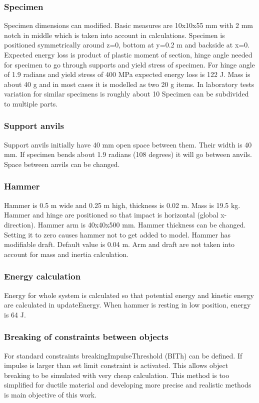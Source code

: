 \subsubsection{Specimen}
Specimen dimensions can modified. Basic measures are 10x10x55 mm with 2 mm notch in middle which is taken into account in calculations. Specimen is positioned symmetrically around z=0, bottom at y=0.2 m and backside at x=0. 
Expected energy loss is product of plastic moment of section, hinge angle needed for specimen to go through supports and 
yield stress of specimen. For hinge angle of 1.9 radians and yield stress of 400 MPa expected energy 
loss is 122 J. Mass is about 40 g and in most cases it is modelled as two 20 g items. In laboratory tests variation for similar 
specimens is roughly about 10 %
Specimen can be subdivided to multiple parts.

\subsubsection{Support anvils}
Support anvils initially have 40 mm open space between them. Their width is 40 mm. 
If specimen bends about 1.9 radians (108 degrees) it will go between anvils. Space between anvils can be changed.

\subsubsection{Hammer}
Hammer is 0.5 m wide and 0.25 m high, thickness is 0.02 m. Mass is 19.5 kg. Hammer and hinge are positioned so that 
impact is horizontal  (global x-direction). Hammer arm is 40x40x500 mm. Hammer thickness can be changed.
Setting it to zero causes hammer not to get added to model. Hammer has modifiable draft. Default value is 0.04 m. 
Arm and draft are not taken into account for mass and inertia calculation.

\subsubsection{Energy calculation}

Energy for whole system is calculated so that potential energy and kinetic energy are calculated in updateEnergy. 
When hammer is resting in low position, energy is 64 J. 

\subsubsection{Breaking of constraints between objects}
For standard \bullet constraints breakingImpulseThreshold (BITh) can be defined. If impulse is larger than set limit constraint is activated. 
This allows object breaking to be simulated with very cheap calculation. 
This method is too simplified for ductile material and developing more precise and realistic methods is main objective of this work.  

